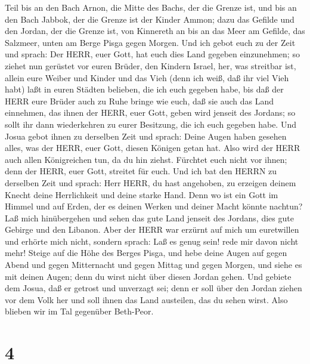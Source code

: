 Teil bis an den Bach Arnon, die Mitte des Bachs, der die Grenze ist, und
bis an den Bach Jabbok, der die Grenze ist der Kinder Ammon;
 dazu das Gefilde und den Jordan, der die Grenze ist, von
Kinnereth an bis an das Meer am Gefilde, das Salzmeer, unten am Berge
Pisga gegen Morgen.  Und ich gebot euch zu der Zeit und
sprach: Der HERR, euer Gott, hat euch dies Land gegeben einzunehmen; so
ziehet nun gerüstet vor euren Brüder, den Kindern Israel, her, was
streitbar ist,  allein eure Weiber und Kinder und das Vieh
(denn ich weiß, daß ihr viel Vieh habt) laßt in euren Städten belieben,
die ich euch gegeben habe,  bis daß der HERR eure Brüder
auch zu Ruhe bringe wie euch, daß sie auch das Land einnehmen, das ihnen
der HERR, euer Gott, geben wird jenseit des Jordans; so sollt ihr dann
wiederkehren zu eurer Besitzung, die ich euch gegeben habe.
 Und Josua gebot ihnen zu derselben Zeit und sprach: Deine
Augen haben gesehen alles, was der HERR, euer Gott, diesen Königen getan
hat. Also wird der HERR auch allen Königreichen tun, da du hin ziehst.
 Fürchtet euch nicht vor ihnen; denn der HERR, euer Gott,
streitet für euch.  Und ich bat den HERRN zu derselben Zeit
und sprach:  Herr HERR, du hast angehoben, zu erzeigen
deinem Knecht deine Herrlichkeit und deine starke Hand. Denn wo ist ein
Gott im Himmel und auf Erden, der es deinen Werken und deiner Macht
könnte nachtun?  Laß mich hinübergehen und sehen das gute
Land jenseit des Jordans, dies gute Gebirge und den Libanon.
 Aber der HERR war erzürnt auf mich um euretwillen und
erhörte mich nicht, sondern sprach: Laß es genug sein! rede mir davon
nicht mehr!  Steige auf die Höhe des Berges Pisga, und hebe
deine Augen auf gegen Abend und gegen Mitternacht und gegen Mittag und
gegen Morgen, und siehe es mit deinen Augen; denn du wirst nicht über
diesen Jordan gehen.  Und gebiete dem Josua, daß er getrost
und unverzagt sei; denn er soll über den Jordan ziehen vor dem Volk her
und soll ihnen das Land austeilen, das du sehen wirst. 
Also blieben wir im Tal gegenüber Beth-Peor.

\hypertarget{section-3}{%
\section{4}\label{section-3}}

